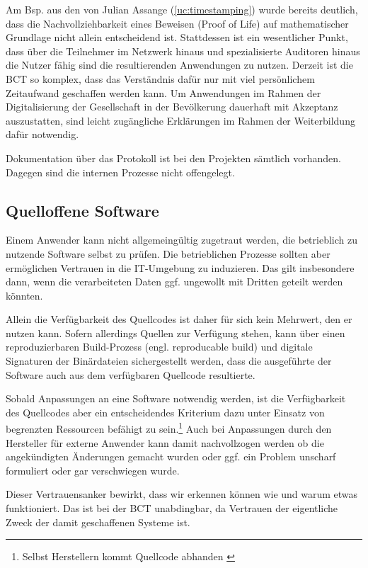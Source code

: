 Am Bsp. aus den  von Julian Assange (\ref{uc:timestamping}) wurde bereits deutlich, dass die Nachvollziehbarkeit eines Beweisen (Proof of Life) auf mathematischer Grundlage nicht allein entscheidend ist.
Stattdessen ist ein wesentlicher Punkt, dass über die Teilnehmer im Netzwerk hinaus und spezialisierte Auditoren hinaus die Nutzer fähig sind die resultierenden Anwendungen zu nutzen.
Derzeit ist die \gls{BCT} so komplex, dass das Verständnis dafür nur mit viel persönlichem Zeitaufwand geschaffen werden kann.
Um Anwendungen im Rahmen der Digitalisierung der Gesellschaft in der Bevölkerung dauerhaft mit Akzeptanz auszustatten, sind leicht zugängliche Erklärungen im Rahmen der Weiterbildung dafür notwendig.

Dokumentation über das Protokoll ist bei den Projekten sämtlich vorhanden.
Dagegen sind die internen Prozesse nicht offengelegt.

\subsection{Quelloffene Software}\label{krit:opensource}

Einem Anwender kann nicht allgemeingültig zugetraut werden, die betrieblich zu nutzende Software selbst zu prüfen. Die betrieblichen Prozesse sollten aber ermöglichen Vertrauen in die IT-Umgebung zu induzieren. Das gilt insbesondere dann, wenn die verarbeiteten Daten ggf. ungewollt mit Dritten geteilt werden könnten.

Allein die Verfügbarkeit des Quellcodes ist daher für sich kein Mehrwert, den er nutzen kann.
Sofern allerdings Quellen zur Verfügung stehen, kann \ua{} über einen reproduzierbaren Build-Prozess (engl. reproducable build) und digitale Signaturen der Binärdateien sichergestellt werden, dass die ausgeführte der Software auch aus dem verfügbaren Quellcode resultierte.

Sobald Anpassungen an eine Software notwendig werden, ist die Verfügbarkeit des Quellcodes aber ein entscheidendes Kriterium dazu unter Einsatz von begrenzten Ressourcen befähigt zu sein.\footnote{Selbst Herstellern kommt Quellcode abhanden \autocite{w:ms-binpatch}}
Auch bei Anpassungen durch den Hersteller für externe Anwender kann damit nachvollzogen werden ob die angekündigten Änderungen gemacht wurden oder ggf. ein Problem unscharf formuliert oder gar verschwiegen wurde.

Dieser Vertrauensanker bewirkt, dass wir erkennen können wie und warum etwas funktioniert.
Das ist bei der \gls{BCT} unabdingbar, da Vertrauen der eigentliche Zweck der damit geschaffenen Systeme ist.

